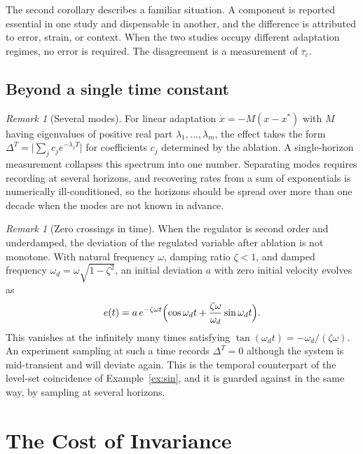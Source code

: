 \documentclass[11pt]{article}
\theoremstyle{definition}
\theoremstyle{remark}
\newtheorem{remark}[theorem]{Remark}
\begin{document}
The second corollary describes a familiar situation. A component is reported essential in one study and dispensable in another, and the difference is attributed to error, strain, or context. When the two studies occupy different adaptation regimes, no error is required. The disagreement is a measurement of $\tau_\varepsilon$.

\subsection{Beyond a single time constant}

\begin{remark}[Several modes]
For linear adaptation $\dot x=-M(x-x^*)$ with $M$ having eigenvalues of positive real part $\lambda_1,\dots,\lambda_m$, the effect takes the form $\Delta^T=\bigl|\sum_j c_j e^{-\lambda_jT}\bigr|$ for coefficients $c_j$ determined by the ablation. A single-horizon measurement collapses this spectrum into one number. Separating modes requires recording at several horizons, and recovering rates from a sum of exponentials is numerically ill-conditioned, so the horizons should be spread over more than one decade when the modes are not known in advance.
\end{remark}

\begin{remark}[Zero crossings in time]
When the regulator is second order and underdamped, the deviation of the regulated variable after ablation is not monotone. With natural frequency $\omega$, damping ratio $\zeta<1$, and damped frequency $\omega_d=\omega\sqrt{1-\zeta^2}$, an initial deviation $a$ with zero initial velocity evolves as
\[
e(t)=a\,e^{-\zeta\omega t}\Bigl(\cos\omega_d t+\frac{\zeta\omega}{\omega_d}\sin\omega_d t\Bigr).
\]
This vanishes at the infinitely many times satisfying $\tan(\omega_d t)=-\omega_d/(\zeta\omega)$. An experiment sampling at such a time records $\Delta^T=0$ although the system is mid-transient and will deviate again. This is the temporal counterpart of the level-set coincidence of Example~\ref{ex:sin}, and it is guarded against in the same way, by sampling at several horizons.
\end{remark}

\section{The Cost of Invariance}\label{sec:cost}
\end{document}
